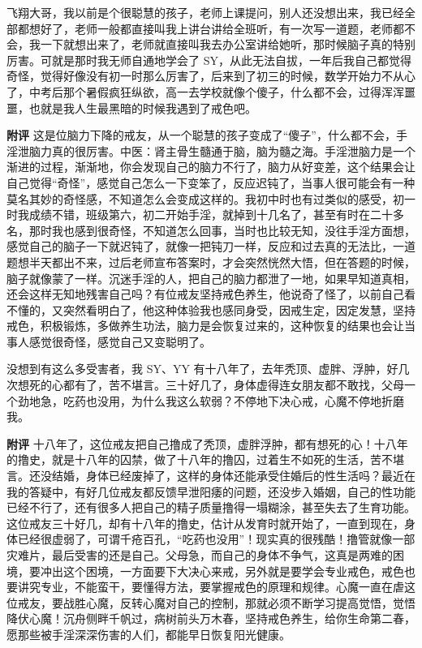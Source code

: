 \begin{case}
    飞翔大哥，我以前是个很聪慧的孩子，老师上课提问，别人还没想出来，我已经全部都想好了，老师一般都直接叫我上讲台讲给全班听，有一次写一道题，老师都不会，我一下就想出来了，老师就直接叫我去办公室讲给她听，那时候脑子真的特别厉害。可就是那时我无师自通地学会了 SY，从此无法自拔，一年后我自己都觉得奇怪，觉得好像没有初一时那么厉害了，后来到了初三的时候，数学开始力不从心了，中考后那个暑假疯狂纵欲，高一去学校就像个傻子，什么都不会，过得浑浑噩噩，也就是我人生最黑暗的时候我遇到了戒色吧。

    \textbf{附评} 这是位脑力下降的戒友，从一个聪慧的孩子变成了“傻子”，什么都不会，手淫泄脑力真的很厉害。中医：肾主骨生髓通于脑，脑为髓之海。手淫泄脑力是一个渐进的过程，渐渐地，你会发现自己的脑力不行了，脑力从好变差，这个结果会让自己觉得“奇怪”，感觉自己怎么一下变笨了，反应迟钝了，当事人很可能会有一种莫名其妙的奇怪感，不知道怎么会变成这样的。我初中时也有过类似的感受，初一时我成绩不错，班级第六，初二开始手淫，就掉到十几名了，甚至有时在二十多名，那时我也感到很奇怪，不知道怎么回事，当时也比较无知，没往手淫方面想，感觉自己的脑子一下就迟钝了，就像一把钝刀一样，反应和过去真的无法比，一道题想半天都出不来，过后老师宣布答案时，才会突然恍然大悟，但在答题的时候，脑子就像蒙了一样。沉迷手淫的人，把自己的脑力都泄了一地，如果早知道真相，还会这样无知地残害自己吗？有位戒友坚持戒色养生，他说奇了怪了，以前自己看不懂的，又突然看明白了，他这种体验我也感同身受，因戒生定，因定发慧，坚持戒色，积极锻炼，多做养生功法，脑力是会恢复过来的，这种恢复的结果也会让当事人感觉很奇怪，感觉自己又变聪明了。
\end{case}

\begin{case}
    没想到有这么多受害者，我 SY、YY 有十八年了，去年秃顶、虚胖、浮肿，好几次想死的心都有了，苦不堪言。三十好几了，身体虚得连女朋友都不敢找，父母一个劲地急，吃药也没用，为什么我这么软弱？不停地下决心戒，心魔不停地折磨我。

    \textbf{附评} 十八年了，这位戒友把自己撸成了秃顶，虚胖浮肿，都有想死的心！十八年的撸史，就是十八年的囚禁，做了十八年的撸囚，过着生不如死的生活，苦不堪言。还没结婚，身体已经废掉了，这样的身体还能承受住婚后的性生活吗？最近在我的答疑中，有好几位戒友都反馈早泄阳痿的问题，还没步入婚姻，自己的性功能已经不行了，还有很多人把自己的精子质量撸得一塌糊涂，甚至失去了生育功能。这位戒友三十好几，却有十八年的撸史，估计从发育时就开始了，一直到现在，身体已经很虚弱了，可谓千疮百孔，“吃药也没用”！现实真的很残酷！撸管就像一部灾难片，最后受害的还是自己。父母急，而自己的身体不争气，这真是两难的困境，要冲出这个困境，一方面要下大决心来戒，另外就是要学会专业戒色，戒色也要讲究专业，不能蛮干，要懂得方法，要掌握戒色的原理和规律。心魔一直在虐这位戒友，要战胜心魔，反转心魔对自己的控制，那就必须不断学习提高觉悟，觉悟降伏心魔！沉舟侧畔千帆过，病树前头万木春，坚持戒色养生，给你生命第二春，愿那些被手淫深深伤害的人们，都能早日恢复阳光健康。
\end{case}

